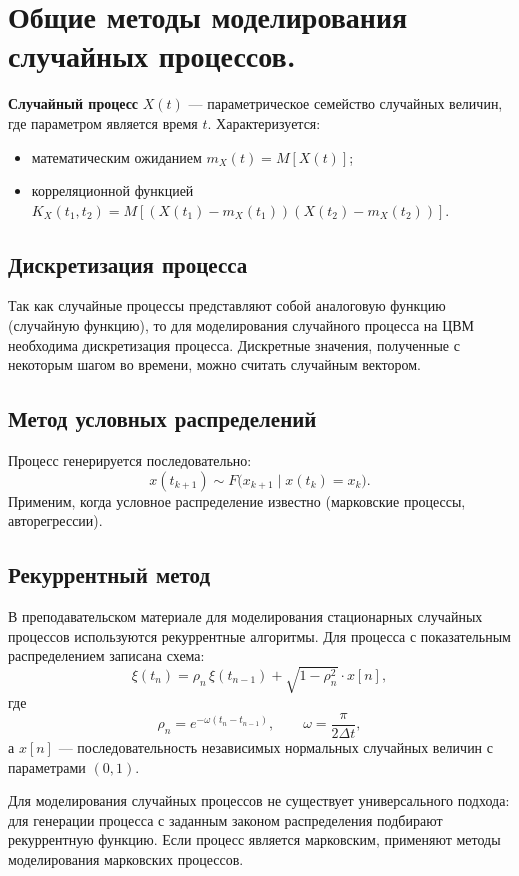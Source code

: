 \section{Общие методы моделирования случайных процессов.}

\textbf{Случайный процесс} $X(t)$ — параметрическое семейство случайных величин, где параметром является время $t$. Характеризуется:
\begin{itemize}
  \item математическим ожиданием $m_X(t) = M[X(t)]$;
  \item корреляционной функцией $K_X(t_1,t_2) = M[(X(t_1)-m_X(t_1))(X(t_2)-m_X(t_2))]$.
\end{itemize}

\subsection*{Дискретизация процесса}

Так как случайные процессы представляют собой аналоговую функцию (случайную функцию), то для моделирования случайного процесса на ЦВМ необходима дискретизация процесса. Дискретные значения, полученные с некоторым шагом во времени, можно считать случайным вектором.

\subsection*{Метод условных распределений}

Процесс генерируется последовательно:
\[
  x(t_{k+1}) \sim F\bigl(x_{k+1}\mid x(t_k) = x_k\bigr).
\]
Применим, когда условное распределение известно (марковские процессы, авторегрессии).

\subsection*{Рекуррентный метод}

В преподавательском материале для моделирования стационарных случайных процессов используются рекуррентные алгоритмы. Для процесса с показательным распределением записана схема:
\[
  \xi(t_n) = \rho_n\,\xi(t_{n-1}) + \sqrt{1 - \rho_n^2}\cdot x[n],
\]
где
\[
  \rho_n = e^{-\omega(t_n-t_{n-1})}, \qquad \omega=\frac{\pi}{2\Delta t},
\]
а $x[n]$ — последовательность независимых нормальных случайных величин с параметрами $(0,1)$.

Для моделирования случайных процессов не существует универсального подхода: для генерации процесса с заданным законом распределения подбирают рекуррентную функцию. Если процесс является марковским, применяют методы моделирования марковских процессов.

\clearpage
